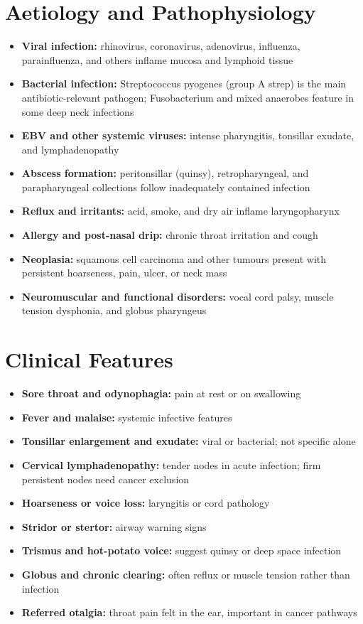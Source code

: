\section*{Aetiology and Pathophysiology}
\begin{itemize}
    \item \textbf{Viral infection:} rhinovirus, coronavirus, adenovirus, influenza, parainfluenza, and others inflame mucosa and lymphoid tissue
    \item \textbf{Bacterial infection:} Streptococcus pyogenes (group A strep) is the main antibiotic-relevant pathogen; Fusobacterium and mixed anaerobes feature in some deep neck infections
    \item \textbf{EBV and other systemic viruses:} intense pharyngitis, tonsillar exudate, and lymphadenopathy
    \item \textbf{Abscess formation:} peritonsillar (quinsy), retropharyngeal, and parapharyngeal collections follow inadequately contained infection
    \item \textbf{Reflux and irritants:} acid, smoke, and dry air inflame laryngopharynx
    \item \textbf{Allergy and post-nasal drip:} chronic throat irritation and cough
    \item \textbf{Neoplasia:} squamous cell carcinoma and other tumours present with persistent hoarseness, pain, ulcer, or neck mass
    \item \textbf{Neuromuscular and functional disorders:} vocal cord palsy, muscle tension dysphonia, and globus pharyngeus
\end{itemize}

\section*{Clinical Features}
\begin{itemize}
    \item \textbf{Sore throat and odynophagia:} pain at rest or on swallowing
    \item \textbf{Fever and malaise:} systemic infective features
    \item \textbf{Tonsillar enlargement and exudate:} viral or bacterial; not specific alone
    \item \textbf{Cervical lymphadenopathy:} tender nodes in acute infection; firm persistent nodes need cancer exclusion
    \item \textbf{Hoarseness or voice loss:} laryngitis or cord pathology
    \item \textbf{Stridor or stertor:} airway warning signs
    \item \textbf{Trismus and hot-potato voice:} suggest quinsy or deep space infection
    \item \textbf{Globus and chronic clearing:} often reflux or muscle tension rather than infection
    \item \textbf{Referred otalgia:} throat pain felt in the ear, important in cancer pathways
\end{itemize}


